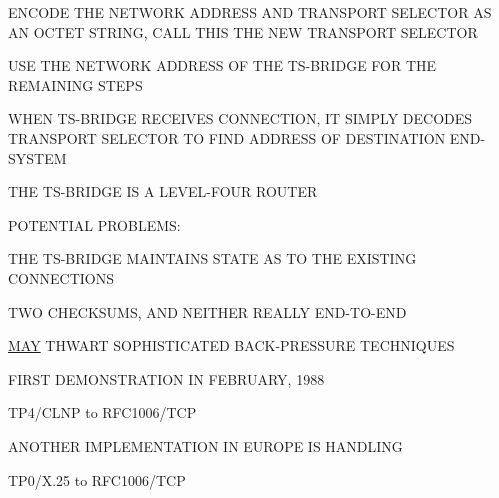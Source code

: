 

\begin{bwslide}

\begin{nrtc}
\item	ENCODE THE NETWORK ADDRESS AND TRANSPORT SELECTOR AS AN OCTET STRING,
	CALL THIS THE NEW TRANSPORT SELECTOR

\item	USE THE NETWORK ADDRESS OF THE TS-BRIDGE FOR THE REMAINING STEPS

\item	WHEN TS-BRIDGE RECEIVES CONNECTION,
	IT SIMPLY DECODES TRANSPORT SELECTOR TO FIND ADDRESS OF
	DESTINATION END-SYSTEM
\end{nrtc}
\end{bwslide}




\begin{bwslide}

\begin{nrtc}
\item	THE TS-BRIDGE IS A LEVEL-FOUR ROUTER

\item	POTENTIAL PROBLEMS:
    \begin{nrtc}
    \item	THE TS-BRIDGE MAINTAINS STATE AS TO THE EXISTING CONNECTIONS

    \item	TWO CHECKSUMS, AND NEITHER REALLY END-TO-END

    \item	\underline{MAY} THWART SOPHISTICATED BACK-PRESSURE TECHNIQUES
    \end{nrtc}
\end{nrtc}
\end{bwslide}


\begin{bwslide}

\begin{nrtc}
\item	FIRST DEMONSTRATION IN FEBRUARY, 1988
    \begin{nrtc}
    \item	TP4/CLNP to RFC1006/TCP
    \end{nrtc}

\item	ANOTHER IMPLEMENTATION IN EUROPE IS HANDLING
    \begin{nrtc}
    \item	TP0/X.25 to RFC1006/TCP
    \end{nrtc}
\end{nrtc}
\end{bwslide}


